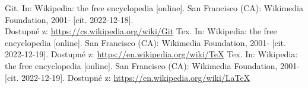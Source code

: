 \documentclass[main.tex]{subfiles}
\begin{document}
\renewcommand{\refname}{Seznam použité literatury a~zdrojů informací} 

\begin{thebibliography}{99}

 Git. In: Wikipedia: the free encyclopedia [online]. San Francisco (CA): Wikimedia Foundation, 2001- [cit. 2022-12-18].\\ Dostupné z: \url{https://cs.wikipedia.org/wiki/Git}
 Tex. In: Wikipedia: the free encyclopedia [online]. San Francisco (CA): Wikimedia Foundation, 2001- [cit. 2022-12-19]. Dostupné z: \url{https://en.wikipedia.org/wiki/TeX}
 Tex. In: Wikipedia: the free encyclopedia [online]. San Francisco (CA): Wikimedia Foundation, 2001- [cit. 2022-12-19]. Dostupné z: \url{https://en.wikipedia.org/wiki/LaTeX}


\end{thebibliography}
\end{document}

